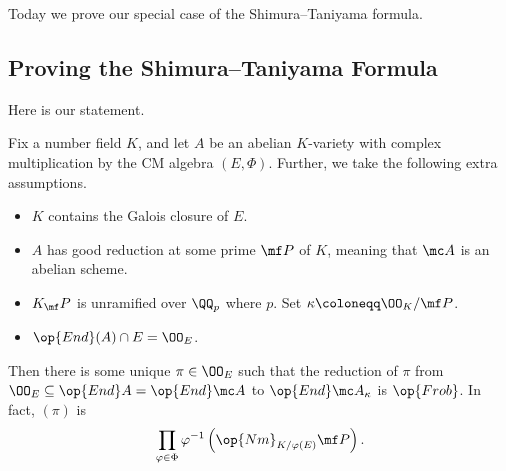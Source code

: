 \documentclass[../notes.tex]{subfiles}
\begin{document}
Today we prove our special case of the Shimura--Taniyama formula.

\subsection{Proving the Shimura--Taniyama Formula}
Here is our statement.
\begin{theorem}
	Fix a number field $K$, and let $A$ be an abelian $K$-variety with complex multiplication by the CM algebra $(E,\Phi)$. Further, we take the following extra assumptions.
	\begin{itemize}
		\item $K$ contains the Galois closure of $E$.
		\item $A$ has good reduction at some prime $\mf P$ of $K$, meaning that $\mc A$ is an abelian scheme.
		\item $K_\mf P$ is unramified over $\QQ_p$ where $p$. Set $\kappa\coloneqq\OO_K/\mf P$.
		\item $\op{End}(A)\cap E=\OO_E$.
	\end{itemize}
	Then there is some unique $\pi\in\OO_E$ such that the reduction of $\pi$ from $\OO_E\subseteq\op{End}A=\op{End}\mc A$ to $\op{End}\mc A_\kappa$ is $\op{Frob}$. In fact, $(\pi)$ is
	\[\prod_{\varphi\in\Phi}\varphi^{-1}\left(\op{Nm}_{K/\varphi(E)}\mf P\right).\]
\end{theorem}
\end{document}
